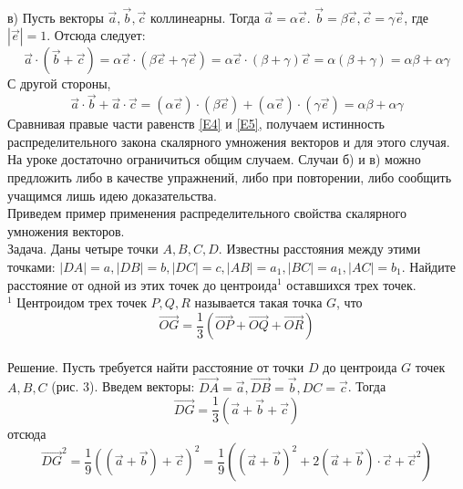 \documentclass{article}
\begin{document}
%
%
%
%
\\в) Пусть векторы $\overrightarrow{a},\overrightarrow{b},\overrightarrow{c}$ коллинеарны. Тогда $\overrightarrow{a}=\alpha\overrightarrow{e}$. $\overrightarrow{b}=\beta\overrightarrow{e},\overrightarrow{c}=\gamma\overrightarrow{e}$, где $|\overrightarrow{e}|=1$. Отсюда следует:
\begin{equation}\label{E4}
\overrightarrow{a}\cdot(\overrightarrow{b}+\overrightarrow{c})=\alpha\overrightarrow{e}\cdot(\beta\overrightarrow{e}+\gamma\overrightarrow{e})=\alpha\overrightarrow{e}\cdot(\beta+\gamma)\overrightarrow{e}=\alpha(\beta+\gamma)=\alpha\beta+\alpha\gamma
\end{equation}
С другой стороны,
\begin{equation}\label{E5}
\overrightarrow{a}\cdot\overrightarrow{b}+\overrightarrow{a}\cdot\overrightarrow{c}=(\alpha\overrightarrow{e})\cdot(\beta\overrightarrow{e})+(\alpha\overrightarrow{e})\cdot(\gamma\overrightarrow{e})=\alpha\beta+\alpha\gamma
\end{equation}
Сравнивая правые части равенств \eqref{E4} и \eqref{E5}, получаем истинность распределительного закона скалярного умножения векторов и для этого случая.
\\На уроке достаточно ограничиться общим случаем. Случаи б) и в) можно предложить либо в качестве упражнений, либо при повторении, либо сообщить учащимся лишь идею доказательства.
\\Приведем пример применения распределительного свойства скалярного умножения векторов.
\\Задача. Даны четыре точки $A,B,C,D$. Известны расстояния между этими точками: $|DA|=a,|DB|=b,|DC|=c,|AB|=a_1,|BC|=a_1,|AC|=b_1$. Найдите расстояние от одной из этих точек до центроида$^1$ оставшихся трех точек.
\\$^1$ Центроидом трех точек $P,Q,R$ называется такая точка $G$, что
$$\overrightarrow{OG}=\frac{1}{3}(\overrightarrow{OP}+\overrightarrow{OQ}+\overrightarrow{OR})$$
\\Решение. Пусть требуется найти расстояние от точки $D$ до центроида $G$ точек $A,B,C$ (рис. 3). Введем векторы: $\overrightarrow{DA}=\overrightarrow{a},\overrightarrow{DB}=\overrightarrow{b},DC=\overrightarrow{c}$. Тогда
$$\overrightarrow{DG}=\frac{1}{3}(\overrightarrow{a}+\overrightarrow{b}+\overrightarrow{c})$$
отсюда 
$$\overrightarrow{DG}^2=\frac{1}{9}((\overrightarrow{a}+\overrightarrow{b})+\overrightarrow{c})^2=\frac{1}{9}((\overrightarrow{a}+\overrightarrow{b})^2+2(\overrightarrow{a}+\overrightarrow{b})\cdot\overrightarrow{c}+\overrightarrow{c}^2)$$
\end{document}
